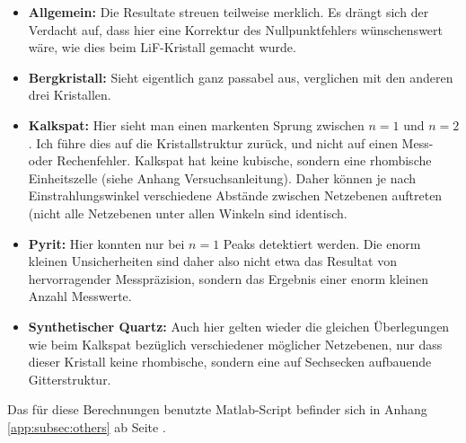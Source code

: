\begin{itemize}
	\item
        \textbf{Allgemein:} Die   Resultate  streuen   teilweise  merklich. Es
        dr\"angt  sich  der  Verdacht  auf,   dass  hier  eine  Korrektur  des
        Nullpunktfehlers w\"unschenswert w\"are, wie dies beim LiF-Kristall
		gemacht wurde.
	\item
        \textbf{Bergkristall:} Sieht eigentlich ganz  passabel aus, verglichen
        mit den anderen drei Kristallen.
	\item
        \textbf{Kalkspat:} Hier  sieht  man  einen markenten  Sprung  zwischen
        $n  = 1$  und  $n  = 2$. Ich  f\"uhre  dies  auf die  Kristallstruktur
        zur\"uck,  und  nicht  auf  einen  Mess-  oder  Rechenfehler. Kalkspat
        hat  keine  kubische,  sondern eine  rhombische  Einheitszelle  (siehe
        Anhang Versuchsanleitung). Daher k\"onnen  je nach Einstrahlungswinkel
        verschiedene  Abst\"ande  zwischen  Netzebenen auftreten  (nicht  alle
        Netzebenen unter allen Winkeln sind identisch.
	\item
        \textbf{Pyrit:} Hier  konnten  nur  bei   $n  =  1$  Peaks  detektiert
        werden. Die enorm  kleinen Unsicherheiten  sind daher also  nicht etwa
        das Resultat von hervorragender  Messpr\"azision, sondern das Ergebnis
        einer enorm kleinen Anzahl Messwerte.
	\item
        \textbf{Synthetischer  Quartz:} Auch hier  gelten wieder  die gleichen
        \"Uberlegungen wie beim Kalkspat bez\"uglich verschiedener m\"oglicher
        Netzebenen, nur  dass dieser  Kristall keine rhombische,  sondern eine
        auf Sechsecken aufbauende Gitterstruktur.
\end{itemize}

Das f\"ur  diese Berechnungen benutzte  Matlab-Script befinder sich  in Anhang \ref{app:subsec:others} ab Seite \pageref{app:subsec:others}.
